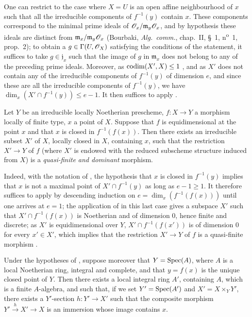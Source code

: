 One can restrict to the case where $X=U$ is an open affine neighbourhood of $x$ such that all the irreducible components of $f^{-1}(y)$ contain $x$.
These components correspond to the minimal prime ideals of $\mathscr{O}_x/\mathfrak{m}_y\mathscr{O}_x$, and by hypothesis these ideals are distinct from $\mathfrak{m}_x/\mathfrak{m}_y\mathscr{O}_x$ (Bourbaki, \emph{Alg.\ comm.}, chap.~II, \S~1, n\textsuperscript{o}~1, prop.~2); to obtain a $g\in\Gamma(U,\mathscr{O}_X)$ satisfying the conditions of the statement, it suffices to take $g\in\mathfrak{j}_x$ such that the image of $g$ in $\mathfrak{m}_x$ does not belong to any of the preceding prime ideals.
Moreover, as $\operatorname{codim}(X',X)\leq 1$ , and as $X'$ does not contain any of the irreducible components of $f^{-1}(y)$ of dimension $e$, and since these are all the irreducible components of $f^{-1}(y)$, we have  $\dim_x(X'\cap f^{-1}(y))\leq e-1$.
It then suffices to apply .

\begin{proposition}[14.5.3]
\label{IV.14.5.3}
Let $Y$ be an irreducible locally Noetherian prescheme, $f:X\to Y$ a morphism locally of finite type, $x$ a point of $X$.
Suppose that $f$ is equidimensional at the point $x$ and that $x$ is closed in $f^{-1}(f(x))$.
Then there exists an irreducible subset $X'$ of $X$, locally closed in $X$, containing $x$, such that the restriction $X'\to Y$ of $f$ (where $X'$ is endowed with the reduced subscheme structure induced from $X$) is a \emph{quasi-finite and dominant} morphism.
\end{proposition}

Indeed, with the notation of , the hypothesis that $x$ is closed in $f^{-1}(y)$ implies that $x$ is not a maximal point of $X'\cap f^{-1}(y)$ as long as $e-1\geq 1$.
It therefore suffices to apply  by descending induction on $e=\dim_x(f^{-1}(f(x)))$ until one arrives at $e=1$; the application of  in this last case gives a subspace $X'$ such that $X'\cap f^{-1}(f(x))$ is Noetherian and of dimension $0$, hence finite and discrete; as $X'$ is equidimensional over $Y$, $X'\cap f^{-1}(f(x'))$ is of dimension $0$ for every $x'\in X'$, which implies that the restriction $X'\to Y$ of $f$ is a quasi-finite morphism .

\begin{corollary}[14.5.4]
\label{IV.14.5.4}
Under the hypotheses of , suppose moreover that $Y=\operatorname{Spec}(A)$, where $A$ is a local Noetherian ring, integral and complete, and that $y=f(x)$ is the unique closed point of $Y$.
Then there exists a local integral ring $A'$, containing $A$, which is a finite $A$-algebra, and such that, if we set $Y'=\operatorname{Spec}(A')$ and $X'=X\times_Y Y'$, there exists a $Y'$-section $h:Y'\to X'$ such that the composite morphism $Y'\xrightarrow{h}X'\to X$ is an immersion whose image contains $x$.
\end{corollary}

